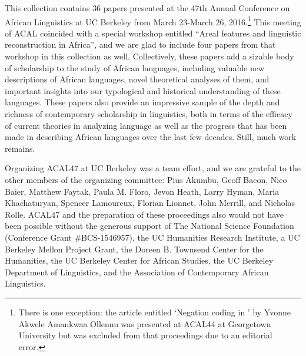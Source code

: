 \begin{refsection}
 

This collection contains 36 papers presented at the 47th Annual Conference on African Linguistics at UC Berkeley from March 23-March 26, 2016.\footnote{There is one exception: the article entitled `Negation coding in ' by Yvonne Akwele Amankwaa Ollennu was presented at ACAL44 at Georgetown University but was excluded from that proceedings due to an editorial error.} This meeting of ACAL coincided with a special workshop entitled ``Areal features and linguistic reconstruction in Africa'', and we are glad to include four papers from that workshop in this collection as well. Collectively, these papers add a sizable body of scholarship to the study of African languages, including valuable new descriptions of African languages, novel theoretical analyses of them, and important insights into our typological and historical understanding of these languages. These papers also provide an impressive sample of the depth and richness of contemporary scholarship in linguistics, both in terms of the efficacy of current theories in analyzing language as well as the progress that has been made in describing African languages over the last few decades. Still, much work remains.

Organizing ACAL47 at UC Berkeley was a team effort, and we are grateful to the other members of the organizing committee: Pius Akumbu, Geoff Bacon, Nico Baier, Matthew Faytak, Paula M. Floro, Jevon Heath, Larry Hyman, Maria Khachaturyan, Spencer Lamoureux, Florian Lionnet, John Merrill, and Nicholas Rolle. ACAL47 and the preparation of these proceedings also would not have been possible without the generous support of The National Science Foundation (Conference Grant \#BCS-1546957), the UC Humanities Research Institute, a UC Berkeley Mellon Project Grant, the Doreen B. Townsend Center for the Humanities, the UC Berkeley Center for African Studies, the UC Berkeley Department of Linguistics, and the Association of Contemporary African Linguistics.


\end{refsection}
